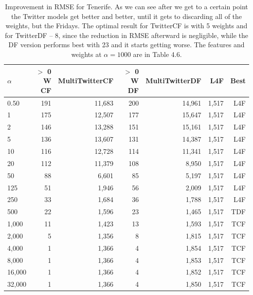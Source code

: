 \documentclass[minf,twoside,singlespacing,parskip,frontabs,notimes,11pt]{infthesis}
\begin{document}
\begin{table}[]
\begin{center}
\begin{tabular}{ l | r | r | r | r | r | r}
$\alpha$ & $>$ 0 W CF & MultiTwitterCF & $>$ 0 W DF & MultiTwitterDF & L4F & Best\\
\hline
0.50 & 191 & 11,683 & 200 & 14,961 & 1,517 & L4F\\
1 & 175 & 12,507 & 177 & 15,647 & 1,517 & L4F\\
2 & 146 & 13,288 & 151 & 15,161 & 1,517 & L4F\\
5 & 136 & 13,607 & 131 & 14,387 & 1,517 & L4F\\
10 & 116 & 12,728 & 114 & 11,341 & 1,517 & L4F\\
20 & 112 & 11,379 & 108 & 8,950 & 1,517 & L4F\\
50 & 88 & 6,601 & 85 & 5,197 & 1,517 & L4F\\
125 & 51 & 1,946 & 56 & 2,009 & 1,517 & L4F\\
250 & 33 & 1,684 & 36 & 1,788 & 1,517 & L4F\\
\hline
500 & 22 & 1,596 & 23 & 1,465 & 1,517 & TDF\\
1,000 & 11 & 1,423 & 13 & 1,593 & 1,517 & TCF\\
2,000 & 5 & 1,356 & 8 & 1,815 & 1,517 & TCF\\
4,000 & 1 & 1,366 & 4 & 1,854 & 1,517 & TCF\\
8,000 & 1 & 1,366 & 4 & 1,853 & 1,517 & TCF\\
16,000 & 1 & 1,366 & 4 & 1,852 & 1,517 & TCF\\
32,000 & 1 & 1,366 & 4 & 1,850 & 1,517 & TCF\\
\end{tabular}
\end{center}
\caption{Improvement in RMSE for Tenerife. As we can see after we get to a certain point the Twitter models get better and better, until it gets to discarding all of the weights, but the Fridays. The optimal result for TwitterCF is with 5 weights and for TwitterDF -- 8, since the reduction in RMSE afterward is negligible, while the DF version performs best with 23 and it starts getting worse. The features and weights at $\alpha = 1000$ are in Table 4.6.}
\label{table-tenerife}
\end{table}
\end{document}
